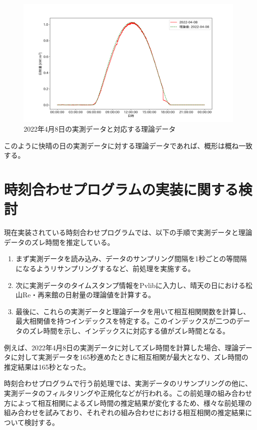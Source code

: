 \documentclass[a4j,12pt,]{jarticle}
\begin{document}
\begin{figure}[H]
  \begin{center}
    \includegraphics[width=160mm]{real_and_theoretical.png}
    \caption{2022年4月8日の実測データと対応する理論データ}
    \label{p4}
  \end{center}
\end{figure}

このように快晴の日の実測データに対する理論データであれば、概形は概ね一致する。

\section{時刻合わせプログラムの実装に関する検討}
現在実装されている時刻合わせプログラムでは、以下の手順で実測データと理論データのズレ時間を推定している。

\begin{enumerate}
\item まず実測データを読み込み、データのサンプリング間隔を1秒ごとの等間隔になるようリサンプリングするなど、前処理を実施する。
\item 次に実測データのタイムスタンプ情報をPvlibに入力し、晴天の日における松山Re・再来館の日射量の理論値を計算する。
\item 最後に、これらの実測データと理論データを用いて相互相関関数を計算し、最大相関値を持つインデックスを特定する。このインデックスが二つのデータのズレ時間を示し、インデックスに対応する値がズレ時間となる。
\end{enumerate}

例えば、2022年4月8日の実測データに対してズレ時間を計算した場合、理論データに対して実測データを165秒進めたときに相互相関が最大となり、ズレ時間の推定結果は165秒となった。

時刻合わせプログラムで行う前処理では、実測データのリサンプリングの他に、実測データのフィルタリングや正規化などが行われる。この前処理の組み合わせ方によって相互相関によるズレ時間の推定結果が変化するため、様々な前処理の組み合わせを試みており、それぞれの組み合わせにおける相互相関の推定結果について検討する。
\end{document}
